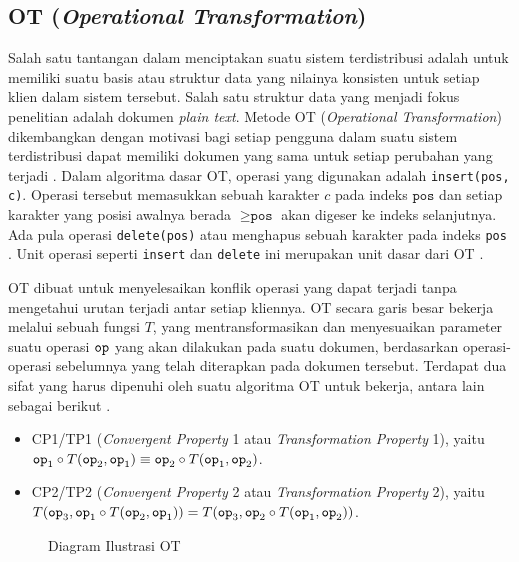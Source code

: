\subsection{OT (\textit{Operational Transformation})}
\label{subsec:OT}

Salah satu tantangan dalam menciptakan suatu sistem terdistribusi adalah untuk memiliki suatu basis atau struktur data yang nilainya konsisten untuk setiap klien dalam sistem tersebut. Salah satu struktur data yang menjadi fokus penelitian adalah dokumen \textit{plain text}. Metode OT (\textit{Operational Transformation}) dikembangkan dengan motivasi bagi setiap pengguna dalam suatu sistem terdistribusi dapat memiliki dokumen yang sama untuk setiap perubahan yang terjadi \citep{Sun1998}. Dalam algoritma dasar OT, operasi yang digunakan adalah \texttt{insert(pos, c)}. Operasi tersebut memasukkan sebuah karakter $c$ pada indeks $\texttt{pos}$ dan setiap karakter yang posisi awalnya berada $\geq \texttt{pos}$ akan digeser ke indeks selanjutnya. Ada pula operasi \texttt{delete(pos)} atau menghapus sebuah karakter pada indeks \texttt{pos} \citep{OTOverview1}. Unit operasi seperti \texttt{insert} dan \texttt{delete} ini merupakan unit dasar dari OT \citep{OTOverview1}.

OT dibuat untuk menyelesaikan konflik operasi yang dapat terjadi tanpa mengetahui urutan terjadi antar setiap kliennya. OT secara garis besar bekerja melalui sebuah fungsi $T$, yang mentransformasikan dan menyesuaikan parameter suatu operasi $\texttt{op}$ yang akan dilakukan pada suatu dokumen, berdasarkan operasi-operasi sebelumnya yang telah diterapkan pada dokumen tersebut. Terdapat dua sifat yang harus dipenuhi oleh suatu algoritma OT untuk bekerja, antara lain sebagai berikut \citep{crdtLecture, OTOverview1}.

\begin{itemize}
    \item CP1/TP1 (\textit{Convergent Property} 1 atau \textit{Transformation Property} 1), yaitu $\texttt{op}_1 \circ T(\texttt{op}_2, \texttt{op}_1) \equiv \texttt{op}_2 \circ T(\texttt{op}_1, \texttt{op}_2)$.
    \item CP2/TP2 (\textit{Convergent Property} 2 atau \textit{Transformation Property} 2), yaitu $T(\texttt{op}_{3},\texttt{op}_{1}\circ T(\texttt{op}_{2},\texttt{op}_{1}))=T(\texttt{op}_{3},\texttt{op}_{2}\circ T(\texttt{op}_{1},\texttt{op}_{2}))$.
\end{itemize}

\begin{figure}[h]
    \centering
    \caption{Diagram Ilustrasi OT}
    \label{fig:OTschema}
\end{figure}

